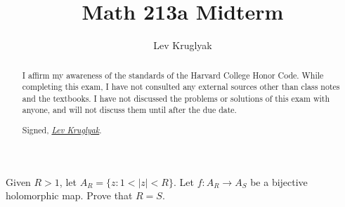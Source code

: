 \documentclass{pset}
\title{Math 213a Midterm}
\author{Lev Kruglyak}
\begin{document}
\maketitle

\vspace{2.5em}
\begin{abstract}
I affirm my awareness of the standards of the Harvard College Honor Code. While completing this exam, I have not consulted any external sources other than class notes and the textbooks. I have not discussed the problems or solutions of this exam with anyone, and will not discuss them until after the due date.

\medskip
Signed, \underline{\textit{Lev Kruglyak}}.
\end{abstract}
\vspace{2.5em}

\begin{problem}{1.42}
  Given $R>1$, let $A_R =\{z : 1 < |z|<R\}$. Let $f : A_R \to A_S$ be a bijective holomorphic map. Prove that $R=S$. %
\end{problem}
\end{document}
